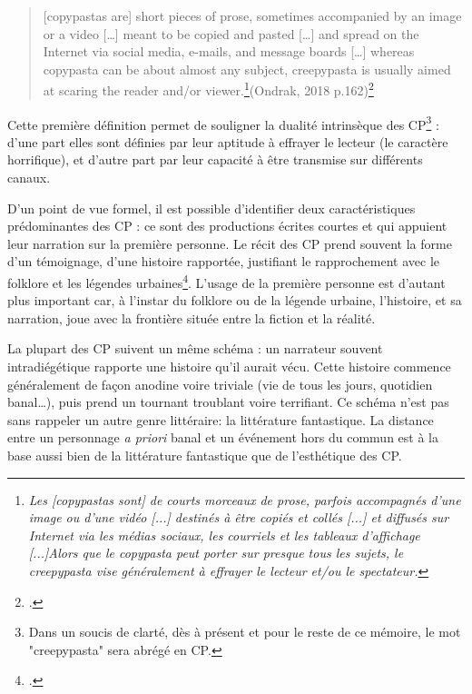 \documentclass[12pt,a4paper,oneside,titlepage]{book} %
\begin{document}
	
	
	\begin{quotation}
		[copypastas are] short pieces of prose, sometimes accompanied by an image or a video […] meant to be copied
		and pasted […] and spread on the Internet via social media, e-mails, and message boards […]
		whereas copypasta can be about almost any subject, creepypasta is usually aimed at scaring
		the reader and/or viewer.\footnote{\emph{Les [copypastas sont] de courts morceaux de prose, parfois accompagnés d'une image ou d'une vidéo [...] destinés à être copiés et collés [...] et diffusés sur Internet via les médias sociaux, les courriels et les tableaux d'affichage [...]Alors que le copypasta peut porter sur presque tous les sujets, le creepypasta vise généralement à effrayer le lecteur et/ou le spectateur.}}(Ondrak, 2018 p.162)\footcite{ondrak_spectres_2018}
	\end{quotation}
	\par
	Cette première définition permet de souligner la dualité intrinsèque des CP\footnote{Dans un soucis de clarté, dès à présent et pour le reste de ce mémoire, le mot "creepypasta" sera abrégé en CP.} : d'une part elles sont définies par leur aptitude à effrayer le lecteur (le caractère horrifique), et d'autre part par leur capacité à être transmise sur différents canaux. \\
\par
D’un point de vue formel, il est possible d’identifier deux caractéristiques prédominantes des CP : ce sont des productions écrites courtes et qui appuient leur narration sur la première personne. Le récit des CP prend souvent la forme d’un témoignage, d’une histoire rapportée, justifiant le rapprochement avec le folklore et les légendes urbaines\footcite{blank_slender_2018}. L’usage de la première personne est d’autant plus important car, à l’instar du folklore ou de la légende urbaine, l’histoire, et sa narration, joue avec la frontière située entre la fiction et la réalité. 
\par
La plupart des CP suivent un même schéma : un narrateur souvent intradiégétique rapporte une histoire qu’il aurait vécu. Cette histoire commence généralement de façon anodine voire triviale (vie de tous les jours, quotidien banal…), puis prend un tournant troublant voire terrifiant. 
Ce schéma n’est pas sans rappeler un autre genre littéraire: la littérature fantastique. La distance entre un personnage \emph{a priori} banal et un événement hors du commun est à la base aussi bien de la littérature fantastique que de l’esthétique des CP. 
\end{document}
